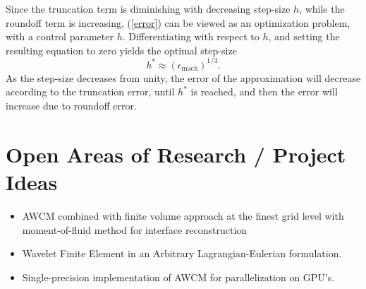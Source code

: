 \documentclass[11pt]{article}
\begin{document}
Since the truncation term is diminishing with decreasing step-size $h$, while the roundoff term is increasing, (\ref{error}) 
can be viewed as an optimization problem, with a control parameter $h$. Differentiating with respect to $h$, and setting
the resulting equation to zero yields the optimal step-size
\begin{equation}
h^{\ast} \approx (\epsilon_{\text{mach}})^{1/3}.
\end{equation}
As the step-size decreases from unity, the error of the approximation will decrease according to the truncation error, until
$h^{\ast}$ is reached, and then the error will increase due to roundoff error.
\section{Open Areas of Research / Project Ideas}
\begin{itemize}
	\item AWCM combined with finite volume approach at the finest grid level with 
            moment-of-fluid method for interface reconstruction
	\item Wavelet Finite Element in an Arbitrary Lagrangian-Eulerian formulation.
	\item Single-precision implementation of AWCM for parallelization on GPU's.
\end{itemize}
\end{document}
